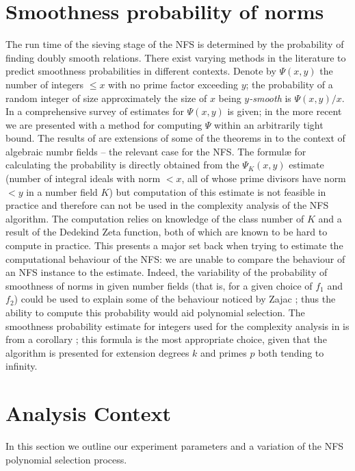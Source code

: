 \documentclass[a4paper, 12pt, envcountsect, runningheads]{llncs}
\numberwithin{figure}{section}
\numberwithin{equation}{section}
\begin{document}
\section{Smoothness probability of norms}
\label{s:smooth}
The run time of the sieving stage of the NFS is determined by the probability of finding doubly smooth relations. There exist varying methods in the literature to predict smoothness probabilities in different contexts.
Denote by $\Psi(x,y)$ the number of integers $\leq x$ with no prime factor exceeding $y$; the probability of a random integer of size approximately the size of $x$ being {\em $y$-smooth} is $\Psi(x,y)/x.$ 
In \cite{hild-tene} a comprehensive survey of estimates for $\Psi(x,y)$ is given; in the more recent \cite{dan_psi_est} we are presented with a method for computing $\Psi$ within an arbitrarily tight bound. The results of \cite{krause} are extensions of some of the theorems in \cite{hild-tene} to the context of algebraic numbr fields -- the relevant case for the NFS. The formul{\ae} for calculating the probability is directly obtained from the $\Psi_K(x,y)$ estimate (number of integral ideals with norm $< x$, all of whose prime divisors have norm $< y$ in a number field $K$) \cite[Satz 3]{krause} but computation of this estimate is not feasible in practice and therefore can not be used in the complexity analysis of the NFS algorithm. The computation relies on knowledge of the class number of $K$ and a result of the Dedekind Zeta function, both of which are known to be hard to compute in practice.
This presents a major set back when trying to estimate the computational behaviour of the NFS: we are unable to compare the behaviour of an NFS instance to the estimate. Indeed, the variability of the probability of smoothness of norms in given number fields (that is, for a given choice of $f_1$ and $f_2$) could be used to explain some of the behaviour noticed by Zajac \cite{zajac}; thus the ability to compute this probability would aid polynomial selection. 
The smoothness probability estimate for integers used for the complexity analysis in \cite{joux-lercier-smart-vercauteren06} is from a corollary \cite[page 15]{can-er-pom}; this formula is the most appropriate choice, given that the algorithm is presented for extension degrees $k$ and primes $p$ both tending to infinity. 

\section{Analysis Context}
\label{s:context}
In this section we outline our experiment parameters and a variation of the NFS polynomial selection process. 
\end{document}
